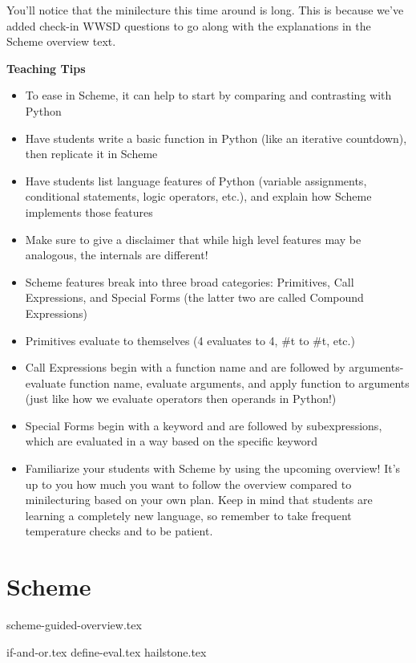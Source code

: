 \documentclass{exam}
\begin{document}
\begin{meta}
    You'll notice that the minilecture this time around is long. This is because we've added check-in WWSD questions to go along with the explanations in the Scheme overview text. \\
    \vspace{10px}

\textbf{Teaching Tips}
\begin{itemize}
    \item To ease in Scheme, it can help to start by comparing and contrasting with Python
    \item Have students write a basic function in Python (like an iterative countdown), then replicate it in Scheme
    \item Have students list language features of Python (variable assignments, conditional statements, logic operators, etc.), and explain how Scheme implements those features
    \item Make sure to give a disclaimer that while high level features may be analogous, the internals are different!
    \item Scheme features break into three broad categories: Primitives, Call Expressions, and Special Forms (the latter two are called Compound Expressions)
    \item Primitives evaluate to themselves (4 evaluates to 4, \#t to \#t, etc.)
    \item Call Expressions begin with a function name and are followed by arguments- evaluate function name, evaluate arguments, and apply function to arguments (just like how we evaluate operators then operands in Python!)
    \item Special Forms begin with a keyword and are followed by subexpressions, which are evaluated in a way based on the specific keyword
    \item Familiarize your students with Scheme by using the upcoming overview! It's up to you how much you want to follow the overview compared to minilecturing based on your own plan. Keep in mind that students are learning a completely new language, so remember to take frequent temperature checks and to be patient.
\end{itemize}
\end{meta}

\section{Scheme}
{scheme-guided-overview.tex}
\begin{questions}
{if-and-or.tex}
{define-eval.tex}
{hailstone.tex}
\end{questions}
\end{document}
